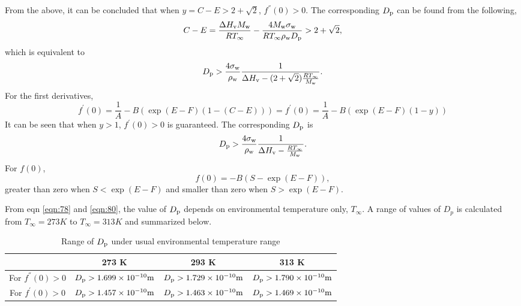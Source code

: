 \documentclass[12pt]{article}
\begin{document}
{From the above, it can be concluded that when $y=C-E>2+\sqrt{2}$, $f^{''}(0)>0$.
The corresponding $D_{\rm p}$ can be found from the following,
\begin{equation}\label{eqn:77}
C-E=\frac{\Delta H_{\rm v}M_{\rm w}}{RT_{\infty}}-\frac{4M_{\rm w}\sigma_{\rm w}}{RT_{\infty}\rho_{\rm w}D_{\rm p}}>2+\sqrt{2},
\end{equation} 
which is equivalent to 
\begin{equation}\label{eqn:78}
D_{\rm p}>\frac{4 \sigma_{\rm w}}{\rho_{\rm w}}\frac{1}{\Delta H_{\rm v}-(2+\sqrt{2})\frac{R T_{\infty}}{M_{\rm w}}}.
\end{equation}
For the first derivatives, 
\begin{equation}\label{eqn:79}
f^{'}(0)=\frac{1}{A}-B(\exp(E-F)(1-(C-E)))=f^{'}(0)=\frac{1}{A}-B(\exp(E-F)(1-y))
\end{equation}
It can be seen that when $y>1$, $f^{'}(0)>0$ is guaranteed. The corresponding $D_{\rm p}$ is
\begin{equation}\label{eqn:80}
D_{\rm p}>\frac{4 \sigma_{\rm w}}{\rho_{\rm w}}\frac{1}{\Delta H_{\rm v}-\frac{R T_{\infty}}{M_{\rm w}}}.
\end{equation}
 For $f(0)$, 
\begin{equation}\label{eqn:81}
f(0)=-B(S-\exp(E-F)),
\end{equation} 
greater than zero when $S<\exp(E-F)$ and smaller than zero when $S>\exp(E-F)$.

From eqn \ref{eqn:78} and \ref{eqn:80}, the value of $D_{\rm p}$ depends on environmental temperature only, $T_{\infty}$. A range of values of $D_{p}$ is calculated from $T_{\infty}=273K$ to $T_{\infty}=313K$ and summarized below.

\begin{table}\label{table:2}
\caption{Range of $D_{\rm p}$ under usual environmental temperature range}
\begin{center}
\begin{tabular}{cccc} \hline
   & 273 K  &  293 K  &  313 K \\ \hline
For $f^{''}(0)>0 $ & $D_{\rm p}>1.699\times 10^{-10} \rm m$  & $D_{\rm p}>1.729\times 10^{-10} \rm m$ & $D_{\rm p}>1.790\times 10^{-10} \rm m$   \\ 
For $f^{'}(0)>0 $  & $D_{\rm p}>1.457\times 10^{-10} \rm m$ &  $D_{\rm p}>1.463\times 10^{-10} \rm m$ & $D_{\rm p}>1.469\times 10^{-10 \rm } \rm m$ \\ \hline
\end{tabular}
\end{center}
\end{table}

}
\end{document}

